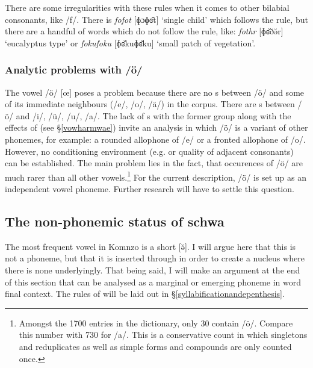 There are some irregularities with these rules when it comes to other bilabial consonants, like /f/. There is \emph{fofot} [ɸɔɸɞ̆t] `single child' which follows the rule, but there are a handful of words which do not follow the rule, like: \emph{fothr} [ɸɞ̆ðə̆r] `eucalyptus type' or \emph{fokufoku} [ɸɞ̆kuɸɞ̆ku] `small patch of vegetation'.
\vspace{-.2cm}

\subsubsection{Analytic problems with /ö/}\label{probl-oe}

The vowel /ö/ [œ] poses a problem because there are no s between /ö/ and some of its immediate neighbours (/e/, /o/, /ä/) in the corpus. There are s between /ö/ and /i/, /ü/, /u/, /a/. The lack of s with the former group along with the effects of  (see \S{}\ref{vowharmwae}) invite an analysis in which /ö/ is a variant of other phonemes, for example: a rounded allophone of /e/ or a fronted allophone of /o/. However, no conditioning environment (e.g.  or quality of adjacent consonants) can be established. The main problem lies in the fact, that occurences of /ö/ are much rarer than all other vowels.\footnote{Amongst the 1700 entries in the dictionary, only 30 contain /ö/. Compare this number with 730 for /a/. This is a conservative count in which singletons and reduplicates as well as simple forms and compounds are only counted once.} For the current description, /ö/ is set up as an independent vowel phoneme. Further research will have to settle this question.
\vspace{-.2cm}

\subsection{The non-phonemic status of schwa} \label{schwa-as-non-phoneme}

The most frequent vowel in Komnzo is a short  [ə̆]. I will argue here that this is not a phoneme, but that it is inserted through  in order to create a  nucleus where there is none underlyingly. That being said, I will make an argument at the end of this section that  can be analysed as a marginal or emerging phoneme in word final context. The rules of  will be laid out in \S{}\ref{syllabificationandepenthesis}.%

